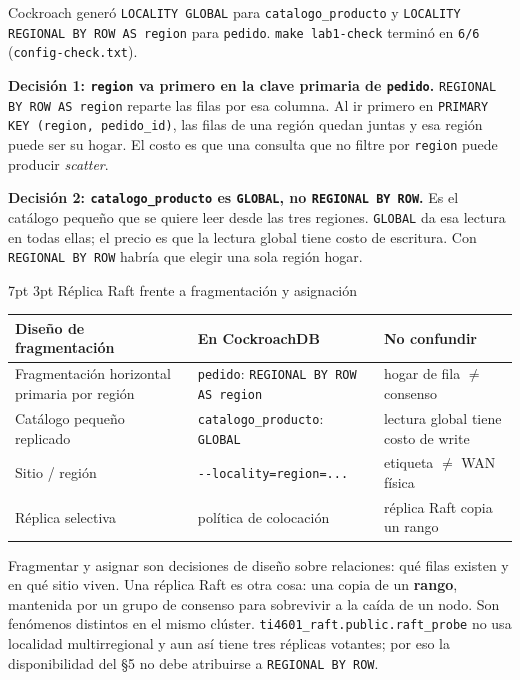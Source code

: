 \documentclass[10pt,letterpaper]{article}
\makeatletter
\renewcommand\section{\@startsection{section}{1}{\z@}%
  {7pt \@plus 2pt \@minus 1pt}{3pt}%
  {\normalfont\normalsize\bfseries\color{acc}}}
\makeatother
\begin{document}
Cockroach generó \texttt{LOCALITY GLOBAL} para \texttt{catalogo\_producto} y
\texttt{LOCALITY REGIONAL BY ROW AS region} para \texttt{pedido}. \texttt{make lab1-check} terminó
en \texttt{6/6} (\texttt{config-check.txt}).

\textbf{Decisión 1: \texttt{region} va primero en la clave primaria de \texttt{pedido}.}
\texttt{REGIONAL BY ROW AS region} reparte las filas por esa columna. Al ir primero en
\texttt{PRIMARY KEY (region, pedido\_id)}, las filas de una región quedan juntas y esa región puede
ser su hogar. El costo es que una consulta que no filtre por \texttt{region} puede producir
\emph{scatter}.

\textbf{Decisión 2: \texttt{catalogo\_producto} es \texttt{GLOBAL}, no \texttt{REGIONAL BY ROW}.}
Es el catálogo pequeño que se quiere leer desde las tres regiones. \texttt{GLOBAL} da esa lectura
en todas ellas; el precio es que la lectura global tiene costo de escritura. Con
\texttt{REGIONAL BY ROW} habría que elegir una sola región hogar.

\section{Réplica Raft frente a fragmentación y asignación}

\begin{center}\footnotesize
\begin{tabular}{@{}p{}p{}p{}@{}}
\toprule
\textbf{Diseño de fragmentación} & \textbf{En CockroachDB} & \textbf{No confundir} \\
\midrule
Fragmentación horizontal primaria por región & \texttt{pedido}: \texttt{REGIONAL BY ROW AS region} & hogar de fila $\neq$ consenso \\
Catálogo pequeño replicado & \texttt{catalogo\_producto}: \texttt{GLOBAL} & lectura global tiene costo de write \\
Sitio / región & \texttt{-{}-locality=region=...} & etiqueta $\neq$ WAN física \\
Réplica selectiva & política de colocación & réplica Raft copia un rango \\
\bottomrule
\end{tabular}
\end{center}

Fragmentar y asignar son decisiones de diseño sobre relaciones: qué filas existen y en qué sitio
viven. Una réplica Raft es otra cosa: una copia de un \textbf{rango}, mantenida por un grupo de
consenso para sobrevivir a la caída de un nodo. Son fenómenos distintos en el mismo clúster.
\texttt{ti4601\_raft.public.raft\_probe} no usa localidad multirregional y aun así tiene tres
réplicas votantes; por eso la disponibilidad del §5 no debe atribuirse a \texttt{REGIONAL BY ROW}.
\end{document}

